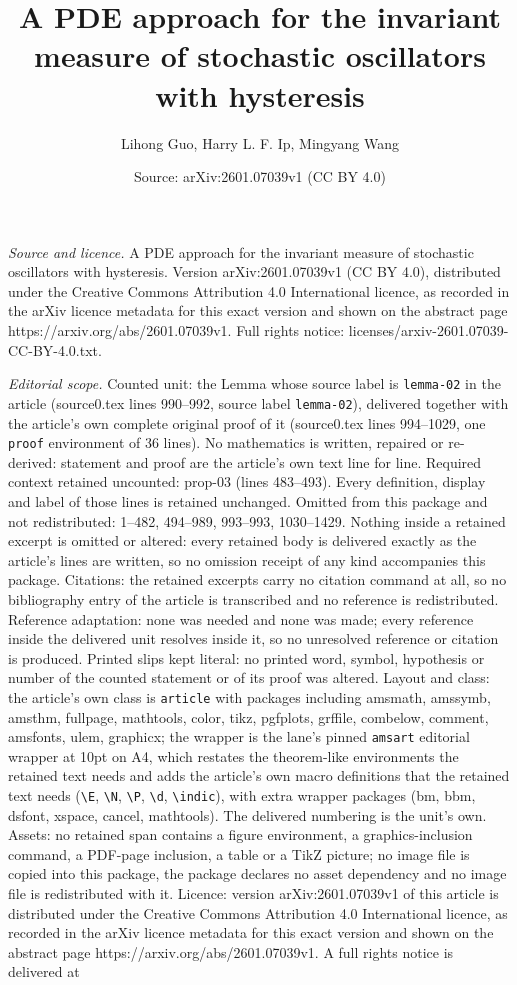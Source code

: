 \documentclass[10pt,a4paper]{amsart}
\title[A PDE approach for the invariant measure of stochastic oscil]{A PDE approach for the invariant measure of stochastic oscillators with hysteresis}
\author{Lihong Guo, Harry L. F. Ip, Mingyang Wang}
\date{Source: arXiv:2601.07039v1 (CC BY 4.0)}
\begin{document}
\maketitle

\noindent\emph{Source and licence.} A PDE approach for the invariant measure of stochastic oscillators with hysteresis. Version arXiv:2601.07039v1 (CC BY 4.0), distributed under the Creative Commons Attribution 4.0 International licence, as recorded in the arXiv licence metadata for this exact version and shown on the abstract page https://arxiv.org/abs/2601.07039v1. Full rights notice: licenses/arxiv-2601.07039-CC-BY-4.0.txt.\par\smallskip

\noindent\textit{Editorial scope.} Counted unit: the Lemma whose source label is \texttt{lemma-02} in the article (source0.tex lines 990--992, source label \texttt{lemma-02}), delivered together with the article's own complete original proof of it (source0.tex lines 994--1029, one \texttt{proof} environment of 36 lines). No mathematics is written, repaired or re-derived: statement and proof are the article's own text line for line. Required context retained uncounted: prop-03 (lines 483--493). Every definition, display and label of those lines is retained unchanged. Omitted from this package and not redistributed: 1--482, 494--989, 993--993, 1030--1429. Nothing inside a retained excerpt is omitted or altered: every retained body is delivered exactly as the article's lines are written, so no omission receipt of any kind accompanies this package. Citations: the retained excerpts carry no citation command at all, so no bibliography entry of the article is transcribed and no reference is redistributed. Reference adaptation: none was needed and none was made; every reference inside the delivered unit resolves inside it, so no unresolved reference or citation is produced. Printed slips kept literal: no printed word, symbol, hypothesis or number of the counted statement or of its proof was altered. Layout and class: the article's own class is \texttt{article} with packages including amsmath, amssymb, amsthm, fullpage, mathtools, color, tikz, pgfplots, grffile, combelow, comment, amsfonts, ulem, graphicx; the wrapper is the lane's pinned \texttt{amsart} editorial wrapper at 10pt on A4, which restates the theorem-like environments the retained text needs and adds the article's own macro definitions that the retained text needs (\texttt{\textbackslash E}, \texttt{\textbackslash N}, \texttt{\textbackslash P}, \texttt{\textbackslash d}, \texttt{\textbackslash indic}), with extra wrapper packages (bm, bbm, dsfont, xspace, cancel, mathtools). The delivered numbering is the unit's own. Assets: no retained span contains a figure environment, a graphics-inclusion command, a PDF-page inclusion, a table or a TikZ picture; no image file is copied into this package, the package declares no asset dependency and no image file is redistributed with it. Licence: version arXiv:2601.07039v1 of this article is distributed under the Creative Commons Attribution 4.0 International licence, as recorded in the arXiv licence metadata for this exact version and shown on the abstract page https://arxiv.org/abs/2601.07039v1. A full rights notice is delivered at 
\end{document}
